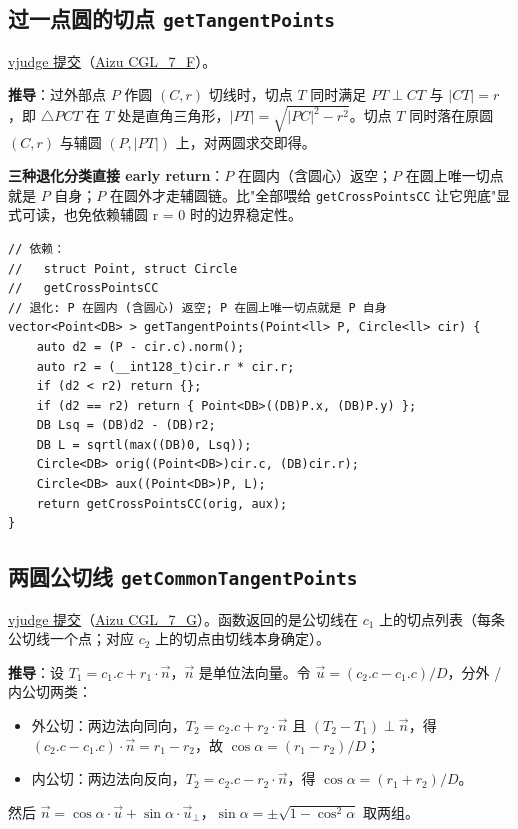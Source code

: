 		\subsection{过一点圆的切点 \texttt{getTangentPoints}}

		\href{https://vjudge.net/solution/69929512}{vjudge 提交}（\href{https://vjudge.net/problem/Aizu-CGL_7_F}{Aizu CGL\_7\_F}）。

		\textbf{推导}：过外部点 $P$ 作圆 $(C, r)$ 切线时，切点 $T$ 同时满足 $PT \perp CT$ 与 $|CT| = r$，即 $\triangle PCT$ 在 $T$ 处是直角三角形，$|PT| = \sqrt{|PC|^2 - r^2}$。切点 $T$ 同时落在原圆 $(C, r)$ 与辅圆 $(P, |PT|)$ 上，对两圆求交即得。

		\textbf{三种退化分类直接 early return}：$P$ 在圆内（含圆心）返空；$P$ 在圆上唯一切点就是 $P$ 自身；$P$ 在圆外才走辅圆链。比"全部喂给 \texttt{getCrossPointsCC} 让它兜底"显式可读，也免依赖辅圆 r = 0 时的边界稳定性。

		\begin{verbatim}
// 依赖：
//   struct Point, struct Circle
//   getCrossPointsCC
// 退化: P 在圆内 (含圆心) 返空; P 在圆上唯一切点就是 P 自身
vector<Point<DB> > getTangentPoints(Point<ll> P, Circle<ll> cir) {
	auto d2 = (P - cir.c).norm();
	auto r2 = (__int128_t)cir.r * cir.r;
	if (d2 < r2) return {};
	if (d2 == r2) return { Point<DB>((DB)P.x, (DB)P.y) };
	DB Lsq = (DB)d2 - (DB)r2;
	DB L = sqrtl(max((DB)0, Lsq));
	Circle<DB> orig((Point<DB>)cir.c, (DB)cir.r);
	Circle<DB> aux((Point<DB>)P, L);
	return getCrossPointsCC(orig, aux);
}
		\end{verbatim}

		\subsection{两圆公切线 \texttt{getCommonTangentPoints}}

		\href{https://vjudge.net/solution/69929554}{vjudge 提交}（\href{https://vjudge.net/problem/Aizu-CGL_7_G}{Aizu CGL\_7\_G}）。函数返回的是公切线在 $c_1$ 上的切点列表（每条公切线一个点；对应 $c_2$ 上的切点由切线本身确定）。

		\textbf{推导}：设 $T_1 = c_1.c + r_1 \cdot \vec{n}$，$\vec{n}$ 是单位法向量。令 $\vec{u} = (c_2.c - c_1.c) / D$，分外 / 内公切两类：
		\begin{itemize}
			\setlength\itemsep{0pt}
			\item 外公切：两边法向同向，$T_2 = c_2.c + r_2 \cdot \vec{n}$ 且 $(T_2 - T_1) \perp \vec{n}$，得 $(c_2.c - c_1.c) \cdot \vec{n} = r_1 - r_2$，故 $\cos \alpha = (r_1 - r_2) / D$；
			\item 内公切：两边法向反向，$T_2 = c_2.c - r_2 \cdot \vec{n}$，得 $\cos \alpha = (r_1 + r_2) / D$。
		\end{itemize}
		然后 $\vec{n} = \cos \alpha \cdot \vec{u} + \sin \alpha \cdot \vec{u}_\perp$，$\sin \alpha = \pm \sqrt{1 - \cos^2 \alpha}$ 取两组。


